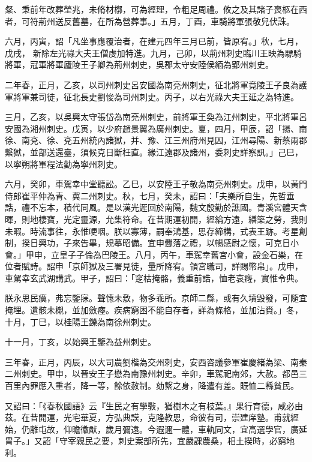 \begin{pinyinscope}
 粲、秉前年改葬塋兆，未脩材槨，可為經理，令粗足周禮。攸之及其諸子喪柩在西者，可符荊州送反舊墓，在所為營葬事。」五月，丁酉，車騎將軍張敬兒伏誅。



 六月，丙寅，詔「凡坐事應覆治者，在建元四年三月已前，皆原宥。」秋，七月，戊戌，
 新除左光祿大夫王僧虔加特進。九月，己卯，以荊州刺史臨川王映為驃騎將軍，冠軍將軍廬陵王子卿為荊州刺史，吳郡太守安陸侯緬為郢州刺史。



 二年春，正月，乙亥，以司州刺史呂安國為南兗州刺史，征北將軍竟陵王子良為護軍將軍兼司徒，征北長史劉悛為司州刺史。丙子，以右光祿大夫王延之為特進。



 三月，乙亥，以吳興太守張岱為南兗州刺史，前將軍王奐為江州刺史，平北將軍呂安國為湘州刺史。戊寅，以少府趙景翼為廣州刺史。夏，四月，甲辰，詔「揚、南徐、南兗、徐、兗五州統內諸獄，并、豫、江三州府州見囚，江州尋陽、新蔡兩郡繫獄，並部送還臺，須候克日斷枉直。緣江遠郡及諸州，委刺史詳察訊。」己巳，以寧朔將軍程法勤為寧州刺史。



 六月，癸卯，車駕幸中堂聽訟。乙巳，以安陸王子敬為南兗州刺史。戊申，以黃門
 侍郎崔平仲為青、冀二州刺史。秋，七月，癸未，詔曰：「夫樂所自生，先哲垂誥，禮不忘本，積代同風。是以漢光遲回於南陽，魏文殷勤於譙國。青溪宮體天含暉，則地棲寶，光定靈源，允集符命。在昔期運初開，經綸方遠，繕築之勞，我則未暇。時流事往，永惟哽咽。朕以寡薄，嗣奉鴻基，思存締構，式表王跡。考星創制，揆日興功，子來告畢，規摹昭備。宜申釁落之禮，以暢感尉之懷，可克日小會。」甲申，立皇子子倫為巴陵王。八月，丙午，車駕幸舊宮小會，設金石樂，在位者賦詩。詔申「京師獄及三署見徒，量所降宥。領宮職司，詳賜幣帛」。戊申，車駕幸玄武湖講武。甲子，詔曰：「窆枯掩骼，義重前誥，恤老哀癃，實惟令典。



 朕永思民瘼，弗忘鑒寐。聲憓未敷，物多乖所。京師二縣，或有久墳毀發，可隨宜掩埋。遺骸未櫬，並加斂瘞。疾病窮困不能自存者，詳為條格，並加沾賚。」冬，十月，丁巳，以桂陽王鑠為南徐州刺史。



 十一月，丁亥，以始興王鑒為益州刺史。



 三年春，正月，丙辰，以大司農劉楷為交州刺史，安西咨議參軍崔慶緒為梁、南秦二州刺史。甲申，以晉安王子懋為南豫州刺史。辛卯，車駕祀南郊，大赦。都邑三百里內罪應入重者，降一等，餘依赦制。劾繫之身，降遣有差。賑恤二縣貧民。



 又詔曰：「《春秋國語》云『生民之有學斅，猶樹木之有枝葉。』果行育德，咸必由茲。在昔開運，光宅華夏，方弘典謨，克隆教思，命彼有司，崇建庠塾。甫就經始，仍離屯故，仰瞻徽猷，歲月彌遠。今遐邇一體，車軌同文，宜高選學官，廣延胄子。」又詔「守宰親民之要，刺史案部所先，宜嚴課農桑，相土揆時，必窮地利。




\end{pinyinscope}
